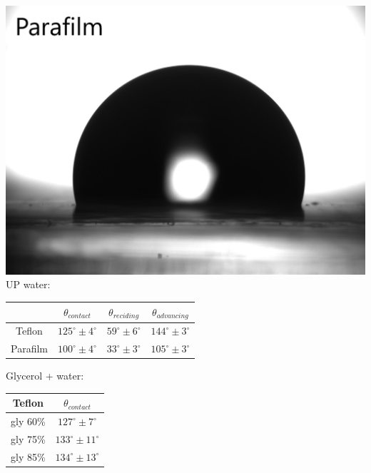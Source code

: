 \documentclass[xcolor=table]{beamer}
\begin{document}
\begin{frame}
\begin{columns}
\begin{column}{.5\textwidth}
	\includegraphics[width=0.5\columnwidth]{parafilm_acqua_1.jpg}\\
	UP water:
	\begin{table}[]
		\begin{tabular}{|c|c|c|c|}
			\hline
			& $\theta_{contact} $& $\theta_{reciding}$ & $\theta_{advancing}$ \\
			\hline
			Teflon   & $125^\circ \pm 4^\circ $                        & $ 59^\circ \pm 6^\circ$                         & $144^\circ \pm 3^\circ$                          \\
			Parafilm & $100^\circ \pm 4^\circ$                         & $33^\circ \pm 3^\circ$                          & $105^\circ \pm 3^\circ $      \\   
			\hline               
		\end{tabular}
	\end{table}
	Glycerol + water:
	\begin{table}[]
		\begin{tabular}{|c|c|}
			\hline
			Teflon   & $\theta_{contact}$ \\
			\hline
			gly 60\% & $127^\circ \pm 7^\circ$             \\
			gly 75\% & $133^\circ \pm 11^\circ$            \\
			gly 85\% & $134^\circ \pm 13^\circ$           \\
			\hline
		\end{tabular}
	\end{table}
\end{column}
\end{columns}

\end{frame}
\end{document}
